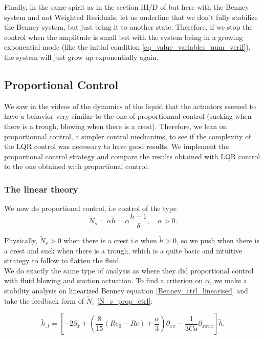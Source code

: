 \documentclass[12pt]{article}
\begin{document}
Finally, in the same spirit as in the section III/D of \cite{Thompson_2016_prop_ctrl} but here with the Benney system and not Weighted Residuals,
let us underline that we don't fully stabilize the Benney system, but just bring it to another state. Therefore, if we stop the control when the amplitude 
is small but with the system being in a growing exponential mode (like the initial condition \eqref{eq_value_variables_num_verif}),
the system will just grow up exponentially again. 


\subsection{Proportional Control}
We saw in the videos of the dynamics of the liquid that the actuators seemed to have a behavior very similar to the one of proportionnal 
control (sucking when there is a trough, blowing when there is a crest). Therefore, we lean on proportionnal control,
a simpler control mechanims, to see if the complexity of the LQR control was necessary to have good results.
We implement the proportional control strategy and compare the results obtained with LQR control to 
the one obtained with proportional control.

\subsubsection{The linear theory}


We now do proportional control, i.e control of the type 
\begin{equation}\label{N_s_prop_ctrl}
    \tilde{N}_s = \alpha\tilde{h} = \alpha \frac{h-1}{\delta}, \quad \alpha >0.
\end{equation}

Physically, $\tilde{N}_s >0$ when there is a crest i.e when $\tilde{h}>0$, so we push when there is a crest
 and suck when there is a trough, which is a quite basic and intuitive strategy to follow to flatten the fluid. 
\\

 We do exactly the same type of analysis as \cite{Thompson_2016_prop_ctrl} where they did proportional control with fluid blowing and suction actuation. To find a criterion on $\alpha$, we make a stability analysis on linearized Benney equation \eqref{Benney_ctrl_linearised} and take the feedback form of $\tilde{N}_s$ \eqref{N_s_prop_ctrl}:  

\begin{equation}
\tilde{h}_{,t} = \left[ -2\partial_x + \left( \frac{8}{15}(Re_0-Re)+\frac{\alpha}{3}\right)\partial_{xx} - \frac{1}{3Ca}\partial_{xxxx}\right]\tilde{h}.
\end{equation}
\end{document}
